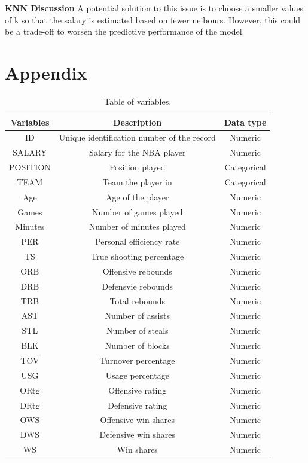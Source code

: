 \documentclass[letterpaper,12pt,twoside,]{pinp}
\begin{document}
\textbf{KNN Discussion} A potential solution to this issue is to choose
a smaller values of k so that the salary is estimated based on fewer
neibours. However, this could be a trade-off to worsen the predictive
performance of the model.

\hypertarget{appendix}{%
\section{Appendix}\label{appendix}}

\begin{table}[ht]
\centering
\begin{tabular}{ |c|c|c|} 
\hline
\textbf{Variables} & \textbf{Description} & \textbf{Data type}\\
\hline
ID & Unique identification number of the record & Numeric\\ 
SALARY & Salary for the NBA player & Numeric \\
POSITION & Position played & Categorical \\
TEAM & Team the player in & Categorical \\
Age & Age of the player & Numeric \\
Games & Number of games played & Numeric \\
Minutes & Number of minutes played & Numeric  \\
PER & Personal efficiency rate & Numeric  \\ 
TS & True shooting percentage & Numeric  \\
ORB & Offensive rebounds & Numeric  \\
DRB & Defensvie rebounds & Numeric  \\
TRB & Total rebounds & Numeric  \\
AST & Number of assists & Numeric  \\
STL & Number of steals & Numeric  \\
BLK & Number of blocks & Numeric  \\
TOV & Turnover percentage & Numeric  \\
USG & Usage percentage & Numeric  \\
ORtg & Offensive rating & Numeric  \\
DRtg & Defensive rating & Numeric  \\
OWS & Offensive win shares & Numeric  \\
DWS & Defensive win shares  & Numeric \\
WS & Win shares & Numeric  \\
\hline
\end{tabular}
\centering
\caption{Table of variables.}
\label{table:var}
\end{table}
\end{document}
